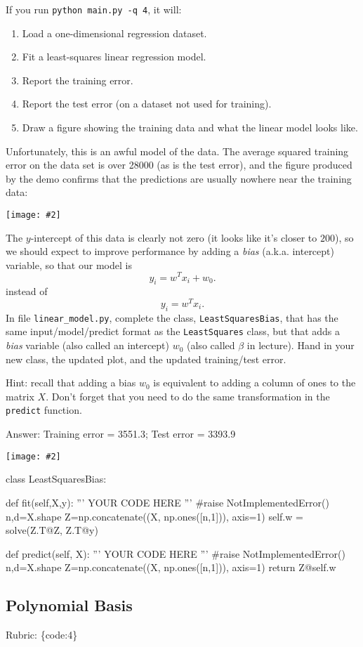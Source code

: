 \documentclass{article}
\def\rubric#1{\gre{Rubric: \{#1\}}}{}
\def\ans#1{\par\gre{Answer: #1}}
\def\blu#1{{\color{blu}#1}}
\def\gre#1{{\color{gre}#1}}
\newcommand{\centerfig}[2]{\begin{center}\texttt{[image: \#2]}\end{center}}
\def\enum#1{\begin{enumerate}#1\end{enumerate}}
\begin{document}
If you run  \verb|python main.py -q 4|, it will:
\enum{
\item Load a one-dimensional regression dataset.
\item Fit a least-squares linear regression model.
\item Report the training error.
\item Report the test error (on a dataset not used for training).
\item Draw a figure showing the training data and what the linear model looks like.
}
Unfortunately, this is an awful model of the data. The average squared training error on the data set is over 28000
(as is the test error), and the figure produced by the demo confirms that the predictions are usually nowhere near
 the training data:
\centerfig{.5}{../figs/least_squares_no_bias.pdf}
The $y$-intercept of this data is clearly not zero (it looks like it's closer to $200$),
so we should expect to improve performance by adding a \emph{bias} (a.k.a. intercept) variable, so that our model is
\[
y_i = w^Tx_i + w_0.
\]
instead of
\[
y_i = w^Tx_i.
\]
\blu{In file \texttt{linear\string_model.py}, complete the class, \texttt{LeastSquaresBias},
that has the same input/model/predict format as the \texttt{LeastSquares} class,
but that adds a \emph{bias} variable (also called an intercept) $w_0$ (also called $\beta$ in lecture). Hand in your new class, the updated plot,
and the updated training/test error.}

Hint: recall that adding a bias $w_0$ is equivalent to adding a column of ones to the matrix $X$. Don't forget that you need to do the same transformation in the \texttt{predict} function.
\ans{Training error = 3551.3; Test error     = 3393.9}
\centerfig{1}{../figs/q4_1.pdf}
\begin{python}
	class LeastSquaresBias:
	
	def fit(self,X,y):
	''' YOUR CODE HERE '''
	#raise NotImplementedError()
	n,d=X.shape
	Z=np.concatenate((X, np.ones([n,1])), axis=1)
	self.w = solve(Z.T@Z, Z.T@y)
	
	def predict(self, X):
	''' YOUR CODE HERE '''
	#raise NotImplementedError()
	n,d=X.shape
	Z=np.concatenate((X, np.ones([n,1])), axis=1)
	return Z@self.w
\end{python}


\subsection{Polynomial Basis}
\rubric{code:4}
\end{document}
